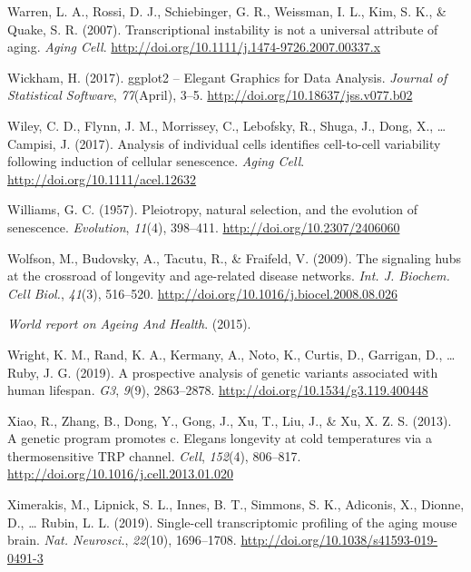 \documentclass[12pt,twoside]{unicam}
\begin{document}
\begin{cslreferences}
\leavevmode\hypertarget{ref-Warren2007}{}%
Warren, L. A., Rossi, D. J., Schiebinger, G. R., Weissman, I. L., Kim, S. K., \& Quake, S. R. (2007). Transcriptional instability is not a universal attribute of aging. \emph{Aging Cell}. \url{http://doi.org/10.1111/j.1474-9726.2007.00337.x}

\leavevmode\hypertarget{ref-Wickham2017}{}%
Wickham, H. (2017). ggplot2 -- Elegant Graphics for Data Analysis. \emph{Journal of Statistical Software}, \emph{77}(April), 3--5. \url{http://doi.org/10.18637/jss.v077.b02}

\leavevmode\hypertarget{ref-Wiley2017}{}%
Wiley, C. D., Flynn, J. M., Morrissey, C., Lebofsky, R., Shuga, J., Dong, X., \ldots{} Campisi, J. (2017). Analysis of individual cells identifies cell-to-cell variability following induction of cellular senescence. \emph{Aging Cell}. \url{http://doi.org/10.1111/acel.12632}

\leavevmode\hypertarget{ref-Williams1957}{}%
Williams, G. C. (1957). Pleiotropy, natural selection, and the evolution of senescence. \emph{Evolution}, \emph{11}(4), 398--411. \url{http://doi.org/10.2307/2406060}

\leavevmode\hypertarget{ref-Wolfson2009}{}%
Wolfson, M., Budovsky, A., Tacutu, R., \& Fraifeld, V. (2009). The signaling hubs at the crossroad of longevity and age-related disease networks. \emph{Int. J. Biochem. Cell Biol.}, \emph{41}(3), 516--520. \url{http://doi.org/10.1016/j.biocel.2008.08.026}

\leavevmode\hypertarget{ref-WHO2015}{}%
\emph{World report on Ageing And Health}. (2015).

\leavevmode\hypertarget{ref-Wright2019}{}%
Wright, K. M., Rand, K. A., Kermany, A., Noto, K., Curtis, D., Garrigan, D., \ldots{} Ruby, J. G. (2019). A prospective analysis of genetic variants associated with human lifespan. \emph{G3}, \emph{9}(9), 2863--2878. \url{http://doi.org/10.1534/g3.119.400448}

\leavevmode\hypertarget{ref-Xiao2013}{}%
Xiao, R., Zhang, B., Dong, Y., Gong, J., Xu, T., Liu, J., \& Xu, X. Z. S. (2013). A genetic program promotes c. Elegans longevity at cold temperatures via a thermosensitive TRP channel. \emph{Cell}, \emph{152}(4), 806--817. \url{http://doi.org/10.1016/j.cell.2013.01.020}

\leavevmode\hypertarget{ref-Ximerakis2019}{}%
Ximerakis, M., Lipnick, S. L., Innes, B. T., Simmons, S. K., Adiconis, X., Dionne, D., \ldots{} Rubin, L. L. (2019). Single-cell transcriptomic profiling of the aging mouse brain. \emph{Nat. Neurosci.}, \emph{22}(10), 1696--1708. \url{http://doi.org/10.1038/s41593-019-0491-3}


\end{cslreferences}
\end{document}
